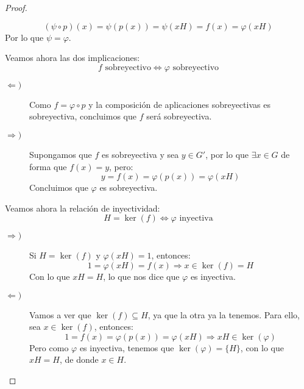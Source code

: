 \begin{teo}
\begin{proof}
\begin{itemize}
\begin{equation*}
                    (\psi\circ p)(x) = \psi(p(x)) = \psi(xH) = f(x) = \varphi(xH)
                \end{equation*}
                Por lo que $\psi = \varphi$.
        \end{itemize}
        Veamos ahora las dos implicaciones:
        \begin{equation*}
            f \text{\ sobreyectivo} \Longleftrightarrow \varphi \text{\ sobreyectivo}
        \end{equation*}
        \begin{description}
            \item [$\Longleftarrow)$] Como $f = \varphi\circ p$ y la composición de aplicaciones sobreyectivas es sobreyectiva, concluimos que $f$ será sobreyectiva.
            \item [$\Longrightarrow)$] Supongamos que $f$ es sobreyectiva y sea $y\in G'$, por lo que $\exists x\in G$ de forma que $f(x) = y$, pero:
                \begin{equation*}
                    y = f(x) = \varphi(p(x)) = \varphi(xH)
                \end{equation*}
                Concluimos que $\varphi$ es sobreyectiva.
        \end{description}
        Veamos ahora la relación de inyectividad:
        \begin{equation*}
            H = \ker(f) \Longleftrightarrow \varphi \text{\ inyectiva}
        \end{equation*}
        \begin{description}
            \item [$\Longrightarrow)$] Si $H=\ker(f)$ y $\varphi(xH) = 1$, entonces:
                \begin{equation*}
                    1 = \varphi(xH) = f(x) \Longrightarrow x\in \ker(f) = H
                \end{equation*}
                Con lo que $xH = H$, lo que nos dice que $\varphi$ es inyectiva.
            \item [$\Longleftarrow)$] Vamos a ver que $\ker(f) \subseteq H$, ya que la otra ya la tenemos. Para ello, sea $x\in \ker(f)$, entonces:
                \begin{equation*}
                    1 = f(x) = \varphi(p(x)) = \varphi(xH) \Longrightarrow xH\in \ker(\varphi)
                \end{equation*}
                Pero como $\varphi$ es inyectiva, tenemos que $\ker(\varphi) = \{H\}$, con lo que $xH = H$, de donde $x\in H$.
        \end{description}
    \end{proof}
\end{teo}

